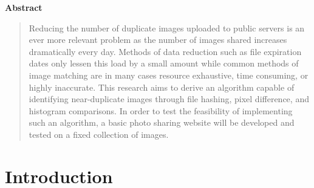 \documentclass[11pt]{article}
\begin{document}
\begin{center}
\large\bf Abstract
\vspace{-1em}  %
\end{center}


\begin{quote}
Reducing the number of duplicate images uploaded to public servers is an ever more relevant problem as the number of images shared increases dramatically every day. Methods of data reduction such as file expiration dates only lessen this load by a small amount while common methods of image matching are in many cases resource exhaustive, time consuming, or highly inaccurate. This research aims to derive an algorithm capable of identifying near-duplicate images through file hashing, pixel difference, and histogram comparisons. In order to test the feasibility of implementing such an algorithm, a basic photo sharing website will be developed and tested on a fixed collection of images.
\end{quote}

\section{Introduction}
\label{sec:introduction}
\vspace*{-.1in}

\end{document}

